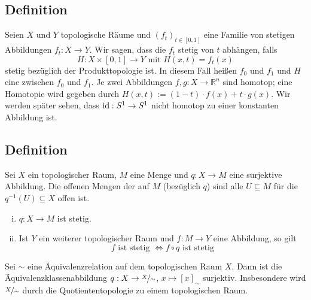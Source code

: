 \subsection[Definition: Homotopie und homotop]{Definition} %
\label{sub:28}
Seien $X$ und $Y$ topologische Räume und $(f_t)_{t \in [0,1]}$ eine Familie von stetigen Abbildungen $f_t : X \to Y$. Wir sagen, dass die $f_t$ stetig von $t$ abhängen,
falls 
\[
	H : X \times [0,1] \to Y \text{ mit } H(x,t) = f_t(x)
\]
stetig bezüglich der Produkttopologie ist. In diesem Fall heißen $f_0$ und $f_1$  und $H$ eine  zwischen $f_0$ und $f_1$. 
Je zwei Abbildungen $f,g : X \to \mathds{R}^n$ sind homotop; eine Homotopie wird gegeben durch $H(x,t) := (1-t)\cdot f(x) + t \cdot g(x)$. Wir werden später sehen, dass 
$\operatorname{id} : S^1 \to S^1$ nicht homotop zu einer konstanten Abbildung ist.

\subsection[Definition: Quotiententopologie]{Definition} %
\label{sub:29}
Sei $X$ ein topologischer Raum, $M$ eine Menge und $q : X \to M$ eine surjektive Abbildung. Die offenen Mengen der  auf $M$ (bezüglich $q$) sind 
alle $U \subseteq M$ für die $q ^{-1} (U ) \subseteq X$ offen ist.
\begin{enumerate}[(i)]
	\item $q : X \to M$ ist stetig.
	\item Ist $Y$ ein weiterer topologischer Raum und $f : M \to Y$ eine Abbildung, so gilt 
	\[
		f \text{ ist stetig } \iff f \circ q \text{ ist stetig}
	\]
\end{enumerate}
Sei $\sim$ eine Äquivalenzrelation auf dem topologischen Raum $X$. Dann ist die Äquivalenzklassenabbildung $q : X \to \nicefrac{X}{\sim}$, $x \mapsto [x]_\sim$ surjektiv.
Insbesondere wird $\nicefrac{X}{\sim}$ durch die Quotiententopologie zu einem topologischen Raum.

